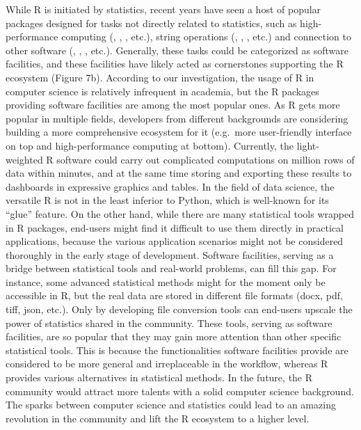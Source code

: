 While R is initiated by statistics, recent years have seen a host of
popular packages designed for tasks not directly related to statistics,
such as high-performance computing (,
, , etc.), string operations
(, , , etc.) and
connection to other software (, ,
, etc.). Generally, these tasks could be categorized
as software facilities, and these facilities have likely acted as
cornerstones supporting the R ecosystem (Figure 7b). According to our
investigation, the usage of R in computer science is relatively
infrequent in academia, but the R packages providing software facilities
are among the most popular ones. As R gets more popular in multiple
fields, developers from different backgrounds are considering building a
more comprehensive ecosystem for it (e.g.~more user-friendly interface
on top and high-performance computing at bottom). Currently, the
light-weighted R software could carry out complicated computations on
million rows of data within minutes, and at the same time storing and
exporting these results to dashboards in expressive graphics and tables.
In the field of data science, the versatile R is not in the least
inferior to Python, which is well-known for its ``glue'' feature. On the
other hand, while there are many statistical tools wrapped in R
packages, end-users might find it difficult to use them directly in
practical applications, because the various application scenarios might
not be considered thoroughly in the early stage of development. Software
facilities, serving as a bridge between statistical tools and real-world
problems, can fill this gap. For instance, some advanced statistical
methods might for the moment only be accessible in R, but the real data
are stored in different file formats (docx, pdf, tiff, json, etc.). Only
by developing file conversion tools can end-users upscale the power of
statistics shared in the community. These tools, serving as software
facilities, are so popular that they may gain more attention than other
specific statistical tools. This is because the functionalities software
facilities provide are considered to be more general and irreplaceable
in the workflow, whereas R provides various alternatives in statistical
methods. In the future, the R community would attract more talents with
a solid computer science background. The sparks between computer science
and statistics could lead to an amazing revolution in the community and
lift the R ecosystem to a higher level.

